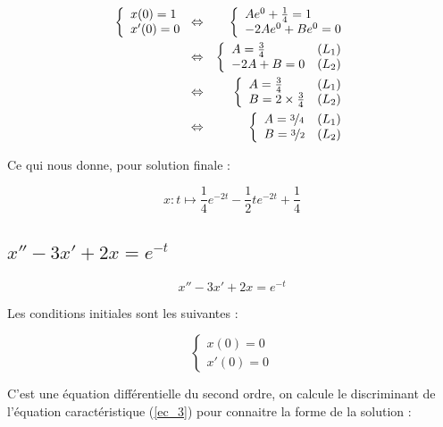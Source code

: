 \documentclass[a4paper, 11pt]{report} %
\renewcommand{\mapsto}{\longmapsto}
\begin{document}
\begin{eqnarray*}
\left\{\begin{array}{l}
x(0) = 1\\
x'(0) = 0
\end{array}\right. & \Leftrightarrow &
\left\{\begin{array}{l}
Ae^0 + \frac{1}{4} = 1\\
-2Ae^0 + Be^0 = 0
\end{array}\right.\\
& \Leftrightarrow &                     %
\left\{\begin{array}{ll}
A = \frac{3}{4} & (L_1)\\
-2A + B = 0 & (L_2)
\end{array}\right.\\
& \Leftrightarrow &                     %
\left\{\begin{array}{ll}
A = \frac{3}{4} & (L_1)\\
B = 2\times\frac{3}{4} & (L_2)
\end{array}\right.\\
& \Leftrightarrow &                     %
\left\{\begin{array}{ll}
A = \nicefrac{3}{4} & (L_1)\\
B = \nicefrac{3}{2} & (L_2)
\end{array}\right.\\
\end{eqnarray*}

Ce qui nous donne, pour solution finale :

\[
x : t \mapsto \frac{1}{4}e^{-2t} - \frac{1}{2}te^{-2t} + \frac{1}{4}
\]
\subsection{$x'' -3x' + 2x = e^{-t}$} %

\begin{equation}
x'' -3x' + 2x = e^{-t}
\label{equa_diff_4}
\end{equation}

Les conditions initiales sont les suivantes :

\[
\left\{\begin{array}{l}
x(0) = 0\\
x'(0) = 0
\end{array}\right.
\]

C'est une équation différentielle du second ordre, on calcule le discriminant de l'équation caractéristique (\ref{ec_3})
pour connaitre la forme de la solution :
\end{document}
